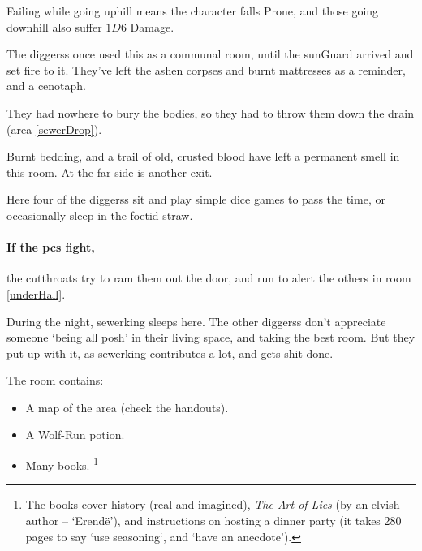 \begin{multicols}{2}
Failing while going uphill means the character falls Prone,%
and those going downhill also suffer $1D6$ Damage.


\begin{exampletext}
  The \glspl{diggers} once used this as a communal room, until the \gls{sunGuard} arrived and set fire to it.
  They've left the ashen corpses and burnt mattresses as a reminder, and a cenotaph.

  They had nowhere to bury the bodies, so they had to throw them down the drain (\gls{area} \vref{sewerDrop}).
\end{exampletext}

\begin{boxtext}
  Burnt bedding, and a trail of old, crusted blood have left a permanent smell in this room.
  At the far side is another exit.
\end{boxtext}


Here four of the \glspl{diggers} sit and play simple dice games to pass the time, or occasionally sleep in the foetid straw.

\paragraph{If the \glspl{pc} fight,}
the cutthroats try to ram them out the door, and run to alert the others in room \ref{underHall}.


\label{sewerKingRoom}

During the night, \gls{sewerking} sleeps here.
The other \glspl{diggers} don't appreciate someone `being all posh' in their living space, and taking the best room.
But they put up with it, as \gls{sewerking} contributes a lot, and gets shit done.

The room contains:

\begin{itemize}
  \item
  A map of the area (check the handouts).
  \item
  A Wolf-Run potion.
  \item
  Many books.%
  \footnote{The books cover history (real and imagined), \textit{The Art of Lies} (by an elvish author -- `Erend\"e'), and instructions on hosting a dinner party (it takes 280 pages to say `use seasoning`, and `have an anecdote').}
\end{itemize}


\end{multicols}

